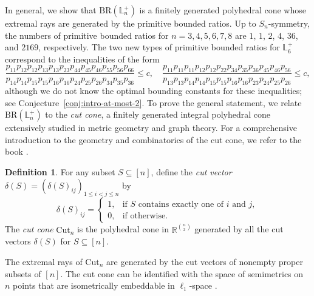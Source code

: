 \documentclass{amsart}
\theoremstyle{definition}
\newtheorem{definition}[theorem]{Definition}
\theoremstyle{remark}
\def\RR{\mathbb{R}}
\def\L{\mathbb{L}}
\def\BR{\mathrm{BR}}
\def\Cut{\mathrm{Cut}}
\begin{document}
In general, we show that $\BR(\L_n^+)$  is a finitely generated polyhedral cone whose extremal rays are generated by the primitive bounded ratios. Up to $S_n$-symmetry, the numbers of primitive bounded ratios for $n=3,4,5,6,7,8$ are $1$, $1$, $2$, $4$, $36$, and $2169$, respectively.
The two new types of primitive bounded ratios for $\L_6^+$ correspond to the inequalities of the form
\[
\frac{p_{11}p_{12}p_{12}p_{13}p_{13}p_{23}p_{44}p_{45}p_{46}p_{55}p_{56}p_{66}}{p_{14}p_{14}p_{15}p_{15}p_{16}p_{16}p_{24}p_{25}p_{26}p_{34}p_{35}p_{36}} \le c, \quad
\frac{p_{11}p_{11}p_{11}p_{12}p_{12}p_{22}p_{34}p_{35}p_{36}p_{45}p_{46}p_{56}}{p_{13}p_{13}p_{14}p_{14}p_{15}p_{15}p_{16}p_{16}p_{23}p_{24}p_{25}p_{26}} \le c,
\]
although we do not know the optimal bounding constants for these inequalities; see Conjecture~\ref{conj:intro-at-most-2}.  
To prove the general statement, we relate $\BR(\L_n^+)$ to the \emph{cut cone}, a finitely generated integral polyhedral cone extensively studied in metric geometry and graph theory. 
For a comprehensive introduction to the geometry and combinatorics of the cut cone, we refer to the book \cite{Deza-Laurent}.

\begin{definition}
For any subset $S \subseteq [n]$, define the \emph{cut vector} $\delta(S)=(\delta(S)_{ij})_{1 \le i < j \le n}$ by
\[
\delta(S)_{ij} = 
\begin{cases}
1, & \text{if $S$ contains exactly one of $i$ and $j$}, \\
0, & \text{if otherwise.}
\end{cases}
\]
The \emph{cut cone} $\Cut_n$ is the polyhedral cone in $\RR^{\binom{n}{2}}$ generated by all the cut vectors $\delta(S)$ for $S \subseteq [n]$.
\end{definition}

The extremal rays of $\Cut_n$ are generated by the cut vectors of nonempty proper subsets of $[n]$.
The cut cone can be identified with the space of semimetrics on $n$ points that are isometrically embeddable in $\ell_1$-space \cite[Section 1.1]{Deza-Laurent}. 
\end{document}
